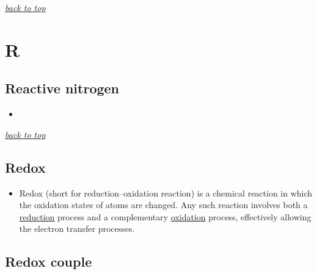 \documentclass[]{book}
\providecommand{\tightlist}{%
  \setlength{\itemsep}{0pt}\setlength{\parskip}{0pt}}
\theoremstyle{definition}
\theoremstyle{definition}
\theoremstyle{definition}
\theoremstyle{remark}
\begin{document}
\emph{\protect\hyperlink{top}{back to top}}

\section{R}\label{r}

\subsection{Reactive nitrogen}\label{reactive-nitrogen}

\begin{itemize}
\item
\end{itemize}

\emph{\protect\hyperlink{top}{back to top}}

\hypertarget{redox}{\subsection{Redox}\label{redox}}

\begin{itemize}
\tightlist
\item
  Redox (short for reduction--oxidation reaction) is a chemical reaction
  in which the oxidation states of atoms are changed. Any such reaction
  involves both a \protect\hyperlink{reduction}{reduction} process and a
  complementary \protect\hyperlink{oxidation}{oxidation} process,
  effectively allowing the electron transfer processes.
\end{itemize}

\subsection{Redox couple}\label{redox-couple}
\end{document}
